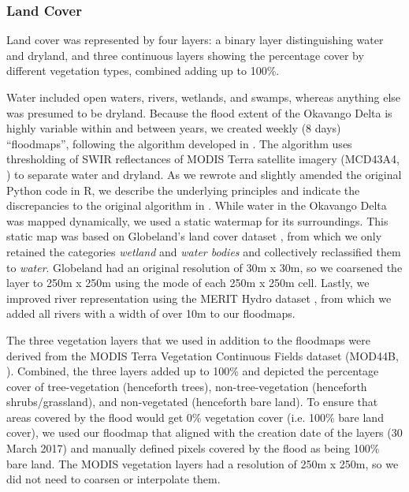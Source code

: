 \documentclass[abstract=on,10pt,a4paper,bibliography=totocnumbered]{scrartcl}
\begin{document}
\newpage
\subsubsection{Land Cover}
Land cover was represented by four layers: a binary layer distinguishing water
and dryland, and three continuous layers showing the percentage cover by
different vegetation types, combined adding up to 100\%.

Water included open waters, rivers, wetlands, and swamps, whereas anything else
was presumed to be dryland. Because the flood extent of the Okavango Delta is
highly variable within and between years, we created weekly (8 days)
``floodmaps'', following the algorithm developed in \cite{Wolski.2017}. The
algorithm uses thresholding of SWIR reflectances of MODIS Terra satellite
imagery (MCD43A4, \citealp{Schaaf.2015}) to separate water and dryland. As we
rewrote and slightly amended the original Python code in R, we describe the
underlying principles and indicate the discrepancies to the original algorithm
in . While water in the Okavango Delta was
mapped dynamically, we used a static watermap for its surroundings. This static
map was based on Globeland's land cover dataset \citep{Chen.2015}, from which we
only retained the categories \textit{wetland} and \textit{water bodies} and
collectively reclassified them to \textit{water}. Globeland had an original
resolution of 30m x 30m, so we coarsened the layer to 250m x 250m using the mode
of each 250m x 250m cell. Lastly, we improved river representation using the
MERIT Hydro dataset \citep{Yamazaki.2019}, from which we added all rivers with a
width of over 10m to our floodmaps.

The three vegetation layers that we used in addition to the floodmaps were
derived from the MODIS Terra Vegetation Continuous Fields dataset (MOD44B,
\citealp{Dimiceli.2015}). Combined, the three layers added up to 100\% and
depicted the percentage cover of tree-vegetation (henceforth trees),
non-tree-vegetation (henceforth shrubs/grassland), and non-vegetated (henceforth
bare land). To ensure that areas covered by the flood would get 0\% vegetation
cover (i.e. 100\% bare land cover), we used our floodmap that aligned with the
creation date of the layers (30 March 2017) and manually defined pixels covered
by the flood as being 100\% bare land. The MODIS vegetation layers had a
resolution of 250m x 250m, so we did not need to coarsen or interpolate them.
\end{document}
